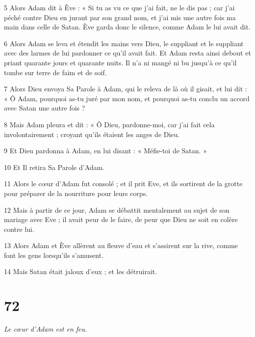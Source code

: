 \par 5 Alors Adam dit à Ève : « Si tu as vu ce que j'ai fait, ne le dis pas ; car j’ai péché contre Dieu en jurant par son grand nom, et j’ai mis une autre fois ma main dans celle de Satan. Ève garda donc le silence, comme Adam le lui avait dit.

\par 6 Alors Adam se leva et étendit les mains vers Dieu, le suppliant et le suppliant avec des larmes de lui pardonner ce qu'il avait fait. Et Adam resta ainsi debout et priant quarante jours et quarante nuits. Il n'a ni mangé ni bu jusqu'à ce qu'il tombe sur terre de faim et de soif.

\par 7 Alors Dieu envoya Sa Parole à Adam, qui le releva de là où il gisait, et lui dit : « Ô Adam, pourquoi as-tu juré par mon nom, et pourquoi as-tu conclu un accord avec Satan une autre fois ?

\par 8 Mais Adam pleura et dit : « Ô Dieu, pardonne-moi, car j'ai fait cela involontairement ; croyant qu'ils étaient les anges de Dieu.

\par 9 Et Dieu pardonna à Adam, en lui disant : « Méfie-toi de Satan. »

\par 10 Et Il retira Sa Parole d'Adam.

\par 11 Alors le cœur d'Adam fut consolé ; et il prit Eve, et ils sortirent de la grotte pour préparer de la nourriture pour leurs corps.

\par 12 Mais à partir de ce jour, Adam se débattit mentalement au sujet de son mariage avec Eve ; il avait peur de le faire, de peur que Dieu ne soit en colère contre lui.

\par 13 Alors Adam et Ève allèrent au fleuve d'eau et s'assirent sur la rive, comme font les gens lorsqu'ils s'amusent.

\par 14 Mais Satan était jaloux d'eux ; et les détruirait.

\chapter{72}

\par \textit{Le cœur d'Adam est en feu.}


